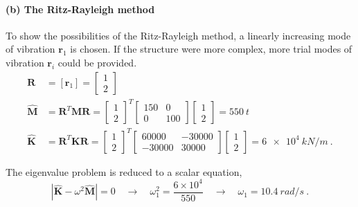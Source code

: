 \begin{Answer}[ref={two_storey}]
\paragraph{(b) The Ritz-Rayleigh method}
To show the possibilities of the Ritz-Rayleigh method, a linearly increasing mode of vibration $\mathbf{r}_1$ is chosen. If the structure were more complex, more trial modes of vibration $\mathbf{r}_i$ could be provided.
\begin{align*}
\mathbf{R} &= [\mathbf{r}_1] = \begin{bmatrix}
    1 \\ 2
\end{bmatrix} \\
\hat{\mathbf{M}} &= \mathbf{R}^T\mathbf{M}\mathbf{R} = \begin{bmatrix}
    1 \\ 2
\end{bmatrix}^T \begin{bmatrix}
    150 & 0 \\
    0 & 100
\end{bmatrix} \begin{bmatrix}
    1 \\
    2
\end{bmatrix} = \SI{550}{t} \\
\hat{\mathbf{K}} &= \mathbf{R}^T\mathbf{K}\mathbf{R} = \begin{bmatrix}
    1 \\ 2
\end{bmatrix}^T \begin{bmatrix}
    60000 & -30000 \\
    -30000 & 30000
\end{bmatrix} \begin{bmatrix}
    1 \\
    2
\end{bmatrix} = \SI{6e4}{kN/m}\ .
\end{align*}

The eigenvalue problem is reduced to a scalar equation,
$$
|\hat{\mathbf{K}} - \omega^2\hat{\mathbf{M}}| = 0
\quad\rightarrow\quad \omega_1^2 = \frac{6\times10^4}{550} \quad\rightarrow\quad \omega_1 = \SI{10.4}{rad/s}\ .
$$

\end{Answer}
